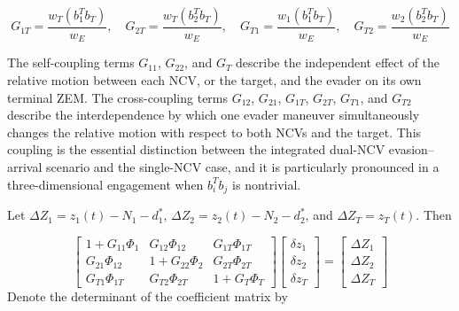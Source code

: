 \begin{equation}
\label{eq:41}
{G_{1T}} = \frac{{{w_T}(b_1^T{b_T})}}{{{w_E}}},\quad {G_{2T}} = \frac{{{w_T}(b_2^T{b_T})}}{{{w_E}}},\quad {G_{T1}} = \frac{{{w_1}(b_1^T{b_T})}}{{{w_E}}},\quad {G_{T2}} = \frac{{{w_2}(b_2^T{b_T})}}{{{w_E}}}
\end{equation}
\begin{remark}
The self-coupling terms ${G_{11}}$, ${G_{22}}$, and ${G_T}$ describe the independent effect of the relative motion between each NCV, or the target, and the evader on its own terminal ZEM. The cross-coupling terms ${G_{12}}$, ${G_{21}}$, ${G_{1T}}$, ${G_{2T}}$, ${G_{T1}}$, and ${G_{T2}}$ describe the interdependence by which one evader maneuver simultaneously changes the relative motion with respect to both NCVs and the target. This coupling is the essential distinction between the integrated dual-NCV evasion--arrival scenario and the single-NCV case, and it is particularly pronounced in a three-dimensional engagement when $b_i^T{b_j}$ is nontrivial.
\end{remark}
Let $\Delta {Z_1} = {z_1}(t) - {N_1} - d_1^*$, $\Delta {Z_2} = {z_2}(t) - {N_2} - d_2^*$, and $\Delta {Z_T} = {z_T}(t)$. Then

\begin{equation}
\label{eq:42}
\left[ {\begin{array}{*{20}{c}}
  {1 + {G_{11}}{\Phi _1}}&{{G_{12}}{\Phi _{12}}}&{{G_{1T}}{\Phi _{1T}}} \\ 
  {{G_{21}}{\Phi _{12}}}&{1 + {G_{22}}{\Phi _2}}&{{G_{2T}}{\Phi _{2T}}} \\ 
  {{G_{T1}}{\Phi _{1T}}}&{{G_{T2}}{\Phi _{2T}}}&{1 + {G_T}{\Phi _T}} 
\end{array}} \right]
\begin{bmatrix}
  {\delta z_1} \\
  {\delta z_2} \\
  {\delta z_T}
\end{bmatrix}
=
\begin{bmatrix}
  {\Delta {Z_1}} \\
  {\Delta {Z_2}} \\
  {\Delta {Z_T}}
\end{bmatrix}
\end{equation}
Denote the determinant of the coefficient matrix by

